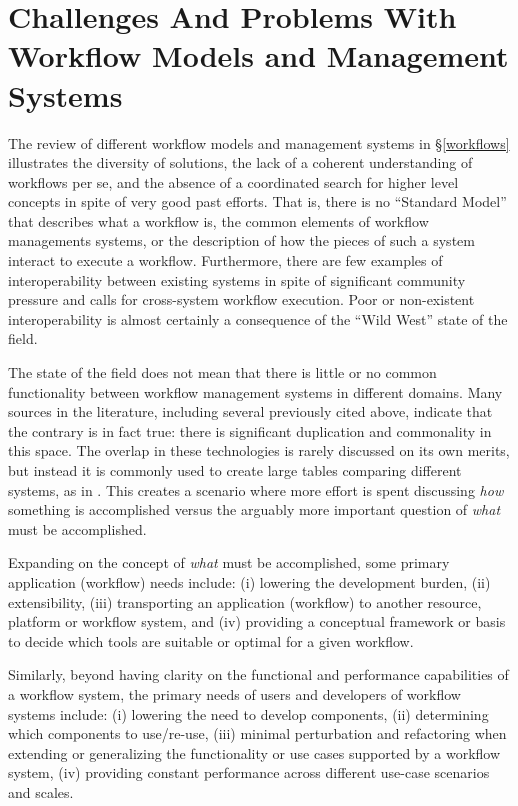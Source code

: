 \section{Challenges And Problems With Workflow Models and Management Systems}\label{commonFunc}

The review of different workflow models and management systems in
\S\ref{workflows} illustrates the diversity of solutions, the lack of a coherent
understanding of workflows per se, and the absence of a coordinated search for
higher level concepts in spite of very good past efforts. That is, there is no
``Standard Model'' that describes what a workflow is, the common elements of
workflow managements systems, or the description of how the pieces of such a
system interact to execute a workflow. Furthermore, there are few examples of
interoperability between existing systems in spite of significant community
pressure and calls for cross-system workflow execution. Poor or non-existent
interoperability is almost certainly a consequence of the ``Wild West'' state of
the field.

The state of the field does not mean that there is little or no common
functionality between workflow management systems in different domains. Many
sources in the literature, including several previously cited above, indicate
that the contrary is in fact true: there is significant duplication and
commonality in this space. The overlap in these technologies is rarely discussed
on its own merits, but instead it is commonly used to create large tables
comparing different systems, as in
\cite{ferreira_da_silva_characterization_nodate}. This creates a scenario where
more effort is spent discussing \textit{how} something is accomplished
versus the arguably more important question of \textit{what} must be
accomplished. 

Expanding on the concept of \textit{what} must be accomplished, some primary application (workflow) needs include:
(i) lowering the development burden, (ii) extensibility, (iii) transporting an
application (workflow) to another resource, platform or workflow system, and
(iv) providing a conceptual framework or basis to decide which tools are suitable or optimal for a given workflow.

Similarly, beyond having clarity on the functional and performance capabilities of a
workflow system, the primary needs of users and developers of workflow systems include: (i) lowering the need to develop components, (ii) determining which components
to use/re-use, (iii) minimal perturbation and refactoring when extending or
generalizing the functionality or use cases supported by a workflow system,
(iv) providing constant performance across different use-case scenarios and
scales.

